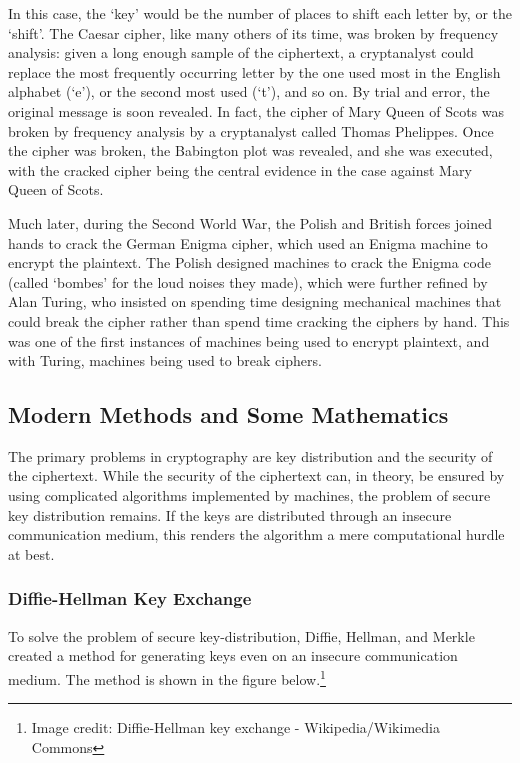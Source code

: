 \documentclass[titlepage]{article}
\begin{document}
In this case, the `key' would be the number of places to shift each letter by, or the `shift'. The
Caesar cipher, like many others of its time, was broken by frequency analysis: given a long enough
sample of the ciphertext, a cryptanalyst could replace the most frequently occurring letter by the
one used most in the English alphabet (`e'), or the second most used (`t'), and so on. By trial and
error, the original message is soon revealed. In fact, the cipher of Mary Queen of Scots was broken
by frequency analysis by a cryptanalyst called Thomas Phelippes. Once the cipher was broken, the
Babington plot was revealed, and she was executed, with the cracked cipher being the central
evidence in the case against Mary Queen of Scots.

Much later, during the Second World War, the Polish and British forces joined hands to crack the
German Enigma cipher, which used an Enigma machine to encrypt the plaintext. The Polish designed
machines to crack the Enigma code (called `bombes' for the loud noises they made), which were further refined
by Alan Turing, who insisted on spending time designing mechanical machines that could break the
cipher rather than spend time cracking the ciphers by hand. This was one of the first instances of
machines being used to encrypt plaintext, and with Turing, machines being used to break ciphers.


\subsection{Modern Methods and Some Mathematics}
The primary problems in cryptography are key distribution and the security of the ciphertext. While
the security of the ciphertext can, in theory, be ensured by using complicated algorithms
implemented by machines, the problem of secure key distribution remains. If the keys are distributed
through an insecure communication medium, this renders the algorithm a mere computational hurdle at
best.

\subsubsection{Diffie-Hellman Key Exchange}
To solve the problem of secure key-distribution, Diffie, Hellman, and Merkle created a method for
generating keys even on an insecure communication medium. \cite{diffie} The method is shown in
the figure below.\footnote{Image credit: Diffie-Hellman key exchange - Wikipedia/Wikimedia Commons}
\end{document}
